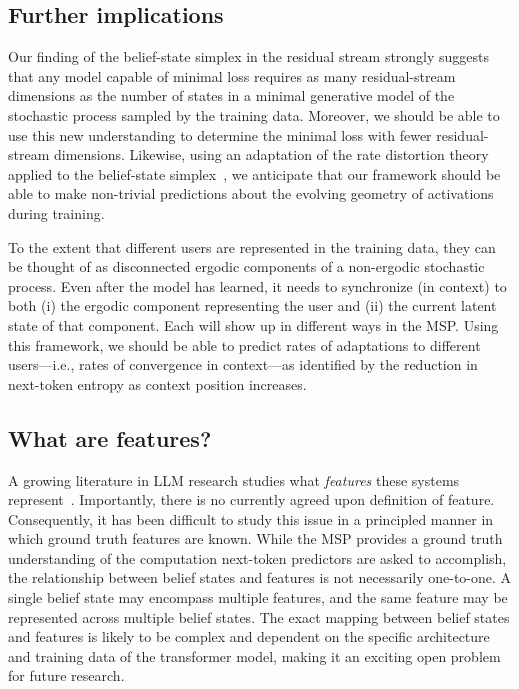 \documentclass{article}
\begin{document}
\subsection{Further implications}

Our finding of the belief-state simplex in the residual stream strongly suggests
that any model capable of minimal loss requires as many residual-stream dimensions
as the number of states in a minimal generative model of the stochastic process sampled by the training data.
Moreover, we should be able to use this new understanding to determine the minimal loss with fewer residual-stream dimensions. Likewise, using an adaptation of the rate distortion theory applied to the belief-state simplex~\citep{Marz17a}, we anticipate that our framework should be able to make non-trivial predictions about the evolving geometry of activations during training.

To the extent that different users are represented in the training data, they can be thought of as disconnected ergodic components of a non-ergodic stochastic process. Even after the model has learned, it needs to synchronize (in context) to both (i) the ergodic component representing the user and (ii) the current latent state of that component. Each will show up in different ways in the MSP.
Using this framework, we should be able to predict rates of adaptations to different users---i.e., rates of convergence in context---as identified by the reduction in next-token entropy as context position increases.

\subsection{What are features?}
A growing literature in LLM research studies what \emph{features} these systems represent~\cite{bricken2023monosemanticity}. Importantly, there is no currently agreed upon definition of feature. Consequently, it has been difficult to study this issue in a principled manner in which ground truth features are known. While the MSP provides a ground truth understanding of the computation next-token predictors are asked to accomplish, the relationship between belief states and features is not necessarily one-to-one. A single belief state may encompass multiple features, and the same feature may be represented across multiple belief states. The exact mapping between belief states and features is likely to be complex and dependent on the specific architecture and training data of the transformer model, making it an exciting open problem for future research.
\end{document}
